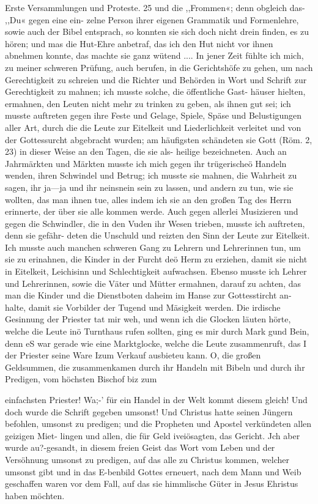 Erste Versammlungen und Proteste. 25
und die ,,Frommen«; denn obgleich das- ,,Du« gegen eine ein-
zelne Person ihrer eigenen Grammatik und Formenlehre, sowie
auch der Bibel entsprach, so konnten sie sich doch nicht drein
finden, es zu hören; und mas die Hut-Ehre anbetraf, das ich
den Hut nicht vor ihnen abnehmen konnte, das machte sie ganz
wütend ....
In jener Zeit fühlte ich mich, zu meiner schweren Prüfung,
auch berufen, in die Gerichtshöfe zu gehen, um nach Gerechtigkeit
zu schreien und die Richter und Behörden in Wort und Schrift
zur Gerechtigkeit zu mahnen; ich musste solche, die öffentliche Gast-
häuser hielten, ermahnen, den Leuten nicht mehr zu trinken zu
geben, als ihnen gut sei; ich musste auftreten gegen ihre Feste
und Gelage, Spiele, Späse und Belustigungen aller Art, durch
die die Leute zur Eitelkeit und Liederlichkeit verleitet und von
der Gottessurcht abgebracht wurden; am häufigsten schändeten
sie Gott (Röm. 2, 23) in dieser Weise an den Tagen, die sie als-
heilige bezeichneten. Auch an Jahrmärkten und Märkten musste
ich mich gegen ihr trügerischeö Handeln wenden, ihren Schwindel
und Betrug; ich musste sie mahnen, die Wahrheit zu sagen, ihr
ja—ja und ihr neinsnein sein zu lassen, und andern zu tun, wie
sie wollten, das man ihnen tue, alles indem ich sie an den großen
Tag des Herrn erinnerte, der über sie alle kommen werde. Auch
gegen allerlei Musizieren und gegen die Schwindler, die in den
Vuden ihr Wesen trieben, musste ich auftreten, denn sie gefähr-
deten die Unschuld und reizten den Sinn der Leute zur Eitelkeit.
Ich musste auch manchen schweren Gang zu Lehrern und Lehrerinnen
tun, um sie zu erinahnen, die Kinder in der Furcht deö Herm zu
erziehen, damit sie nicht in Eitelkeit, Leichisinn und Schlechtigkeit
aufwachsen. Ebenso musste ich Lehrer und Lehrerinnen, sowie die
Väter und Mütter ermahnen, darauf zu achten, das man die
Kinder und die Dienstboten daheim im Hanse zur Gottesstircht an-
halte, damit sie Vorbilder der Tugend und Mäsigkeit werden.
Die irdische Gesinnung der Priester tat mir weh, und wenn
ich die Glocken läuten hörte, welche die Leute inö Turnthaus
rufen sollten, ging es mir durch Mark gund Bein, denn eS war
gerade wie eine Marktglocke, welche die Leute zusammenruft, das I
der Priester seine Ware Izum Verkauf ausbieteu kann. O, die
großen Geldsummen, die zusammenkamen durch ihr Handeln mit
Bibeln und durch ihr Predigen, vom höchsten Bischof biz zum


einfachsten Priester! Wa;-’ für ein Handel in der Welt kommt
diesem gleich! Und doch wurde die Schrift gegeben umsonst! Und
Christus hatte seinen Jüngern befohlen, umsonst zu predigen;
und die Propheten und Apostel verkündeten allen geizigen Miet-
lingen und allen, die für Geld iveiösagten, das Gericht. Jch
aber wurde au?-gesandt, in diesem freien Geist das Wort vom
Leben und der Versöhnung umsonst zu predigen, auf das alle zu
Christus kommen, welcher umsonst gibt und in das E-benbild
Gottes erneuert, nach dem Mann und Weib geschaffen waren
vor dem Fall, auf das sie himmlische Güter in Jesus Ehristus
haben möchten.